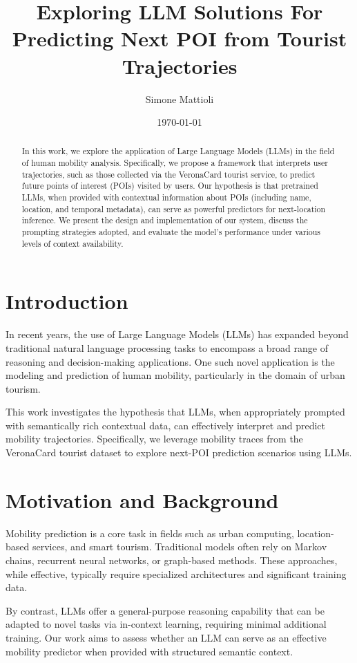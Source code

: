 \documentclass[a4paper,12pt]{article}
\title{Exploring LLM Solutions For Predicting Next POI from Tourist Trajectories
}
\author{Simone Mattioli}
\date{\today}
\begin{document}
\maketitle

\begin{abstract}
In this work, we explore the application of Large Language Models (LLMs) in the field of human mobility analysis. Specifically, we propose a framework that interprets user trajectories, such as those collected via the VeronaCard tourist service, to predict future points of interest (POIs) visited by users. Our hypothesis is that pretrained LLMs, when provided with contextual information about POIs (including name, location, and temporal metadata), can serve as powerful predictors for next-location inference. We present the design and implementation of our system, discuss the prompting strategies adopted, and evaluate the model's performance under various levels of context availability.
\end{abstract}
\clearpage
\section{Introduction}

In recent years, the use of Large Language Models (LLMs) has expanded beyond traditional natural language processing tasks to encompass a broad range of reasoning and decision-making applications. One such novel application is the modeling and prediction of human mobility, particularly in the domain of urban tourism.

This work investigates the hypothesis that LLMs, when appropriately prompted with semantically rich contextual data, can effectively interpret and predict mobility trajectories. Specifically, we leverage mobility traces from the VeronaCard tourist dataset to explore next-POI prediction scenarios using LLMs.

\section{Motivation and Background}

Mobility prediction is a core task in fields such as urban computing, location-based services, and smart tourism. Traditional models often rely on Markov chains, recurrent neural networks, or graph-based methods. These approaches, while effective, typically require specialized architectures and significant training data.

By contrast, LLMs offer a general-purpose reasoning capability that can be adapted to novel tasks via in-context learning, requiring minimal additional training. Our work aims to assess whether an LLM can serve as an effective mobility predictor when provided with structured semantic context.
\end{document}
